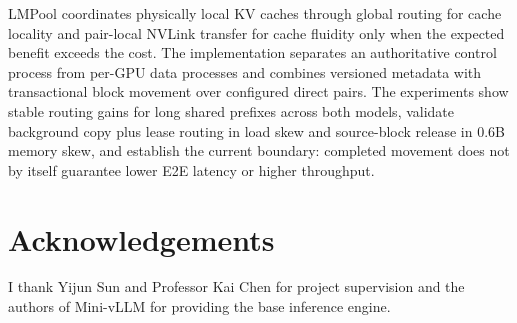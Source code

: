 \documentclass{article}
\newcommand{\sys}{LMPool}
\begin{document}
\sys{} coordinates physically local KV caches through global routing for cache locality and pair-local NVLink transfer for cache fluidity only when the expected benefit exceeds the cost. The implementation separates an authoritative control process from per-GPU data processes and combines versioned metadata with transactional block movement over configured direct pairs. The experiments show stable routing gains for long shared prefixes across both models, validate background copy plus lease routing in load skew and source-block release in 0.6B memory skew, and establish the current boundary: completed movement does not by itself guarantee lower E2E latency or higher throughput.

\section*{Acknowledgements}
I thank Yijun Sun and Professor Kai Chen for project supervision and the authors of Mini-vLLM for providing the base inference engine.



\end{document}
